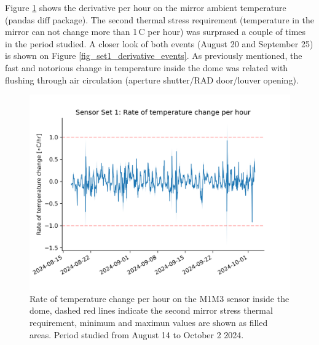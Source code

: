 \documentclass[SE,lsstdraft,authoryear,toc]{lsstdoc}
\begin{document}
Figure \ref{fig_set1_derivative} shows the derivative per hour on the mirror ambient temperature (\textrm{pandas diff package}). The second thermal stress requirement (temperature in the mirror can not change more than 1\,\textdegree C per hour) was surprased a couple of times in the period studied. A closer look of both events (August 20 and September 25) is shown on Figure \ref{fig_set1_derivative_events}. As previously mentioned, the fast and notorious change in temperature inside the dome was related with flushing through air circulation (aperture shutter/RAD door/louver opening).

\begin{figure}[h!]
  \centering
  \includegraphics[width=12cm]{SITCOMTN-141_figures/Sensor1_1h_temp_derivative.png}
  \caption{Rate of temperature change per hour on the M1M3 sensor inside the dome, dashed red lines indicate the second mirror stress thermal requirement, minimum and maximun values are shown as filled areas. Period studied from August 14 to October 2 2024. }
  \label{fig_set1_derivative}
\end{figure}
\end{document}
